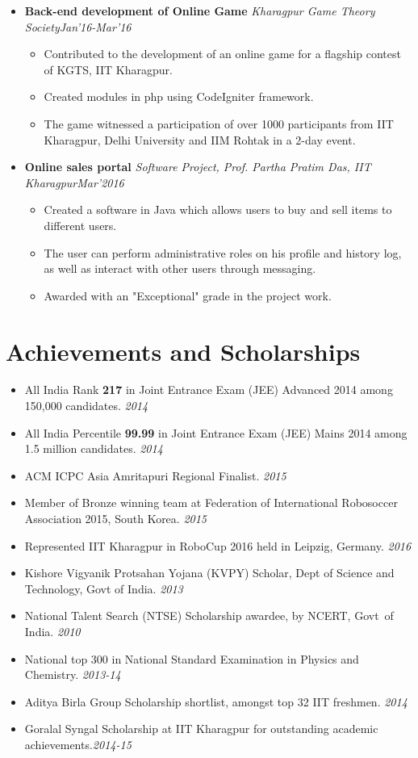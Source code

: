 \documentclass[11pt,a4paper]{moderncv}
\newcommand{\experience}[4]{
  \vspace{0.1cm}
\item \textbf{\large{#1}} \textit{#2}\hfill\textit{#3}
  \begin{itemize}[leftmargin=*]
    \setlength\itemsep{0em} #4
  \end{itemize}
}
\begin{document}
\begin{itemize}
  \experience{Back-end development of Online Game}{Kharagpur Game Theory Society}{Jan'16-Mar'16}{
  \item Contributed to the development of an online game for a flagship contest of KGTS, IIT Kharagpur.
  \item Created modules in php using CodeIgniter framework.
  \item The game witnessed a participation of over 1000 participants from IIT Kharagpur, Delhi University and IIM Rohtak in a 2-day event.
  }

  \experience{Online sales portal}{Software Project, Prof. Partha Pratim Das, IIT Kharagpur}{Mar'2016}{
  \item Created a software in Java which allows users to buy and sell items to different users.
  \item The user can perform administrative roles on his profile and history log, as well as interact with other users through messaging.
  \item Awarded with an "Exceptional" grade in the project work.
  }

\end{itemize}

\vspace{-0.1cm}
\section*{Achievements and Scholarships}
\begin{itemize}
  \setlength\itemsep{0.5em}
\item All India Rank \textbf{217} in Joint Entrance Exam (JEE) Advanced
2014 among 150,000 candidates.             \hfill \textit{2014}
\item All India Percentile \textbf{99.99} in Joint Entrance Exam (JEE) Mains 2014 among 1.5 million candidates.              \hfill \textit{2014}
\item ACM ICPC Asia Amritapuri Regional Finalist.             \hfill \textit{2015}
\item Member of Bronze winning team at Federation of International Robosoccer Association 2015, South Korea. \hfill \textit{2015}
\item Represented IIT Kharagpur in RoboCup 2016 held in Leipzig, Germany.      \hfill \textit{2016}
\item Kishore Vigyanik Protsahan Yojana (KVPY) Scholar, Dept of Science and Technology, Govt of India.
  \hfill \textit{2013}
\item National Talent Search (NTSE) Scholarship awardee, by NCERT, Govt\ of India. \hfill \textit{2010}
\item National top 300 in National Standard Examination in Physics and Chemistry. \hfill \textit{2013-14}
\item Aditya Birla Group Scholarship shortlist, amongst top 32 IIT freshmen.      \hfill \textit{2014}
\item Goralal Syngal Scholarship at IIT Kharagpur for outstanding academic achievements.\hfill \textit{2014-15}

\end{itemize}
\end{document}

